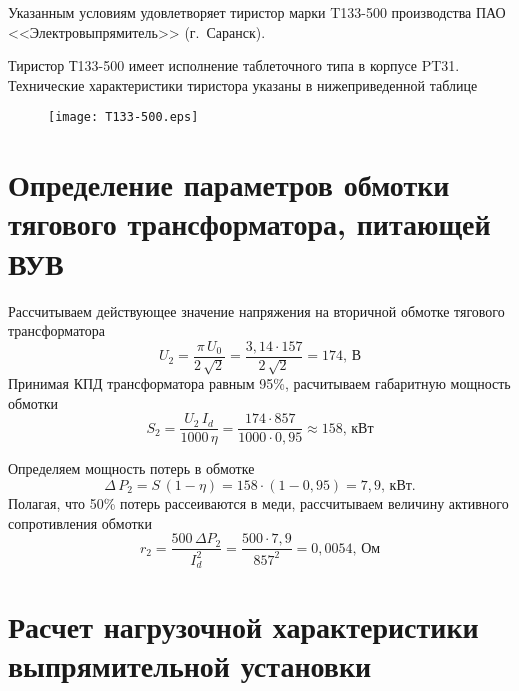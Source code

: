 Указанным условиям удовлетворяет тиристор  марки T133-500 производства ПАО <<Электровыпрямитель>> (г.~Саранск).

Тиристор Т133-500 имеет исполнение таблеточного типа в корпусе PT31. Технические характеристики тиристора указаны в нижеприведенной таблице

\begin{figure}[H]
    \centering        
    \texttt{[image: T133-500.eps]}    
    \label{fig:T133-500}
\end{figure}

\section{Определение параметров обмотки тягового трансформатора, питающей ВУВ}

Рассчитываем действующее значение напряжения на вторичной обмотке тягового трансформатора
\begin{equation*}
 U_2 = \frac{\pi \, U_0}{2\,\sqrt{2}} = \frac{3,14 \cdot 157}{2\,\sqrt{2}} = 174, \, \text{В} 
\end{equation*}
Принимая КПД трансформатора равным 95\%, расчитываем габаритную мощность обмотки
\begin{equation*}
 S_2 = \frac{U_2 \, I_d}{1000 \, \eta}  = \frac{174 \cdot 857}{1000 \cdot 0,95} \approx 158, \, \text{кВт}
\end{equation*}

Определяем мощность потерь в обмотке
\begin{equation*}
 \Delta \, P_2 = S \, (1 - \eta) = 158 \cdot (1 - 0,95) = 7,9, \, \text{кВт}.
\end{equation*}
Полагая, что 50\% потерь рассеиваются в меди, рассчитываем величину активного сопротивления обмотки
\begin{equation*}
 r_2 = \frac{500 \, \Delta P_2}{I_d^2} = \frac{500 \cdot 7,9}{857^2} = 0,0054, \, \text{Ом}
\end{equation*}

\section{Расчет нагрузочной характеристики выпрямительной установки}


